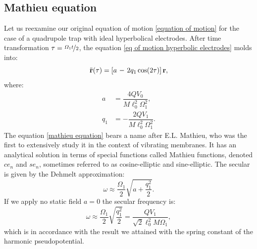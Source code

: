 \subsection{Mathieu equation}
\label{sec:mathieu equation}
Let us reexamine our original equation of motion \eqref{equation of motion} for the case of a quadrupole trap with ideal hyperbolical electrodes. After time transformation $\tau = \nicefrac{\Omega_1 t}{2}$, the equation \eqref{eq of motion hyperbolic electrodes} molds into:
\begin{equation}
	\label{mathieu equation}
	\ddot{\vb{r}}(\tau) = \left[a \minus 2 q_1 \cos(2 \tau)\right] \vb{r},
\end{equation}
where:
\begin{subequations}
\begin{align}
	a &= \dfrac{4 Q V_0}{M \ell_0^2 \Omega_1^2}, \\
	q_1 &= \minus\dfrac{2 Q V_1}{M \ell_0^2 \Omega_1^2}.
\end{align}
\end{subequations}
The equation \eqref{mathieu equation} bears a name after E.L. Mathieu, who was the first to extensively study it in the context of vibrating membranes. It has an analytical solution \cite{5416839} in terms of special functions called Mathieu functions, denoted $ce_n$ and $se_n$, sometimes referred to as cosine-elliptic and sine-elliptic. The secular is given by \cite{gerlich1992inhomogeneous} the Dehmelt approximation:
\begin{equation}
	\omega \approx \frac{\Omega_1}{2} \sqrt{a + \frac{q_1^2}{2}}.
\end{equation}
If we apply no static field $a = 0$ the secular frequency is:
\begin{equation}
	\omega \approx \frac{\Omega_1}{2} \sqrt{\dfrac{q_1^2}{2}} = \dfrac{Q V_1}{\sqrt{2}\ell_0^2 M \Omega_1},
\end{equation}
which is in accordance with the result we attained with the spring constant of the harmonic pseudopotential.

